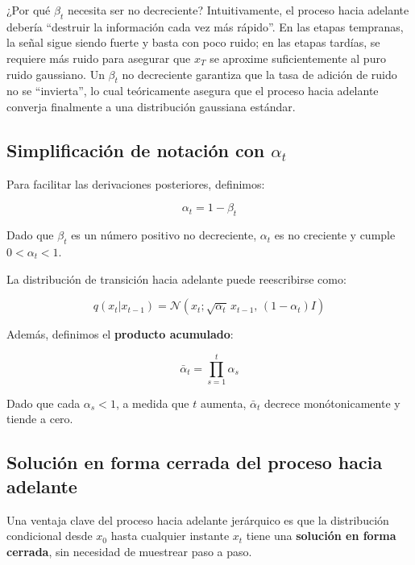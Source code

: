 \begin{knowledgebox}{¿Por qué $\beta_t$ necesita ser no decreciente?}
Intuitivamente, el proceso hacia adelante debería ``destruir la información cada vez más rápido''. En las etapas tempranas, la señal sigue siendo fuerte y basta con poco ruido; en las etapas tardías, se requiere más ruido para asegurar que $x_T$ se aproxime suficientemente al puro ruido gaussiano. Un $\beta_t$ no decreciente garantiza que la tasa de adición de ruido no se ``invierta'', lo cual teóricamente asegura que el proceso hacia adelante converja finalmente a una distribución gaussiana estándar.
\end{knowledgebox}

\subsection{Simplificación de notación con $\alpha_t$}

Para facilitar las derivaciones posteriores, definimos:

$$\alpha_t = 1 - \beta_t$$

Dado que $\beta_t$ es un número positivo no decreciente, $\alpha_t$ es no creciente y cumple $0 < \alpha_t < 1$.

La distribución de transición hacia adelante puede reescribirse como:

$$q(x_t | x_{t-1}) = \mathcal{N}(x_t; \sqrt{\alpha_t} \, x_{t-1}, \, (1 - \alpha_t) I)$$

Además, definimos el \textbf{producto acumulado}:

$$\bar{\alpha}_t = \prod_{s=1}^{t} \alpha_s$$

Dado que cada $\alpha_s < 1$, a medida que $t$ aumenta, $\bar{\alpha}_t$ decrece monótonicamente y tiende a cero.

\subsection{Solución en forma cerrada del proceso hacia adelante}

Una ventaja clave del proceso hacia adelante jerárquico es que la distribución condicional desde $x_0$ hasta cualquier instante $x_t$ tiene una \textbf{solución en forma cerrada}, sin necesidad de muestrear paso a paso.



